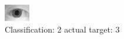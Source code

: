 \begin{figure}[h!]
\begin{center}
\includegraphics[width=0.60\columnwidth]{figures/ID1076_class_2_target_3.png}
\end{center}
\caption{ Classification: 2 actual target: 3}
\label{fig:ID1076_class_2_target_3}
\end{figure}
